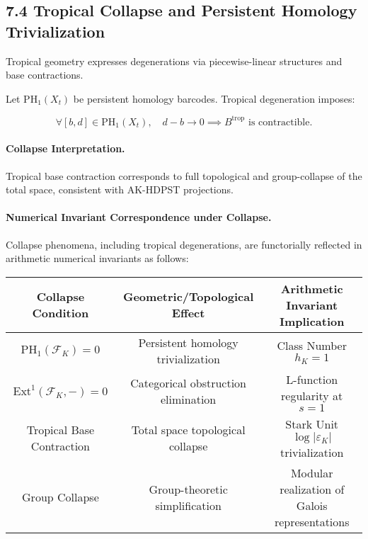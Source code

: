 \documentclass[11pt]{article}
\begin{document}
\subsection*{7.4 Tropical Collapse and Persistent Homology Trivialization}

Tropical geometry expresses degenerations via piecewise-linear structures and base contractions.

Let \( \mathrm{PH}_1(X_t) \) be persistent homology barcodes. Tropical degeneration imposes:

\[
\forall [b,d] \in \mathrm{PH}_1(X_t), \quad d - b \to 0 \implies B^{\mathrm{trop}} \text{ is contractible}.
\]

\paragraph{Collapse Interpretation.}
Tropical base contraction corresponds to full topological and group-collapse of the total space, consistent with AK-HDPST projections.

\paragraph{Numerical Invariant Correspondence under Collapse.}

Collapse phenomena, including tropical degenerations, are functorially reflected in arithmetic numerical invariants as follows:

\begin{center}
\renewcommand{\arraystretch}{1.4}
\begin{tabular}{|c|c|c|}
\hline
\textbf{Collapse Condition} & \textbf{Geometric/Topological Effect} & \textbf{Arithmetic Invariant Implication} \\
\hline
\( \mathrm{PH}_1(\mathcal{F}_K) = 0 \) & Persistent homology trivialization & Class Number \( h_K = 1 \) \\
\hline
\( \mathrm{Ext}^1(\mathcal{F}_K, -) = 0 \) & Categorical obstruction elimination & L-function regularity at \( s = 1 \) \\
\hline
Tropical Base Contraction & Total space topological collapse & Stark Unit \( \log |\varepsilon_K| \) trivialization \\
\hline
Group Collapse & Group-theoretic simplification & Modular realization of Galois representations \\
\hline
\end{tabular}
\end{center}
\end{document}
